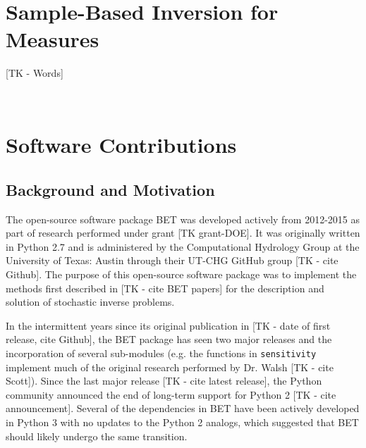 

\
\section{Sample-Based Inversion for Measures}\label{sec:ch02-sample}
[TK - Words]

\
\section{Software Contributions}

\subsection{Background and Motivation}
The open-source software package BET was developed actively from 2012-2015 as part of research performed under grant [TK grant-DOE].
It was originally written in Python 2.7 and is administered by the Computational Hydrology Group at the University of Texas: Austin through their UT-CHG GitHub group [TK - cite Github]. 
The purpose of this open-source software package was to implement the methods first described in [TK - cite BET papers] for the description and solution of stochastic inverse problems. 

In the intermittent years since its original publication in [TK - date of first release, cite Github], the BET package has seen two major releases and the incorporation of several sub-modules (e.g. the functions in {\tt sensitivity} implement much of the original research performed by Dr. Walsh [TK - cite Scott]). 
Since the last major release [TK - cite latest release], the Python community announced the end of long-term support for Python 2 [TK - cite announcement]. 
Several of the dependencies in BET have been actively developed in Python 3 with no updates to the Python 2 analogs, which suggested that BET should likely undergo the same transition.

